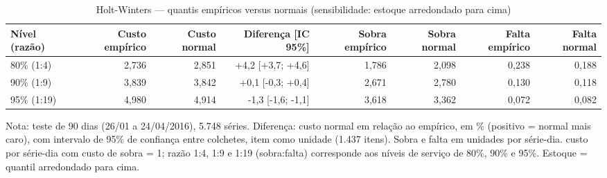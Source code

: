 \begin{table}[htbp]
\centering
\small
\caption{Holt-Winters — quantis empíricos versus normais (sensibilidade: estoque arredondado para cima)}
\label{tab:hw_empirico_vs_normal_sensibilidade}
\begin{tabular}{lrrrrrrr}
\toprule
Nível (razão) & Custo empírico & Custo normal & Diferença [IC 95\%] & Sobra empírico & Sobra normal & Falta empírico & Falta normal \\
\midrule
80\% (1:4) & 2,736 & 2,851 & +4,2 [+3,7; +4,6] & 1,786 & 2,098 & 0,238 & 0,188 \\
90\% (1:9) & 3,839 & 3,842 & +0,1 [-0,3; +0,4] & 2,671 & 2,780 & 0,130 & 0,118 \\
95\% (1:19) & 4,980 & 4,914 & -1,3 [-1,6; -1,1] & 3,618 & 3,362 & 0,072 & 0,082 \\
\bottomrule
\end{tabular}
\par\smallskip
{\footnotesize Nota: teste de 90 dias (26/01 a 24/04/2016), 5.748 séries. Diferença: custo normal em relação ao empírico, em \% (positivo = normal mais caro), com intervalo de 95\% de confiança entre colchetes, item como unidade (1.437 itens). Sobra e falta em unidades por série-dia. custo por série-dia com custo de sobra = 1; razão 1:4, 1:9 e 1:19 (sobra:falta) corresponde aos níveis de serviço de 80\%, 90\% e 95\%. Estoque = quantil arredondado para cima.}
\end{table}
